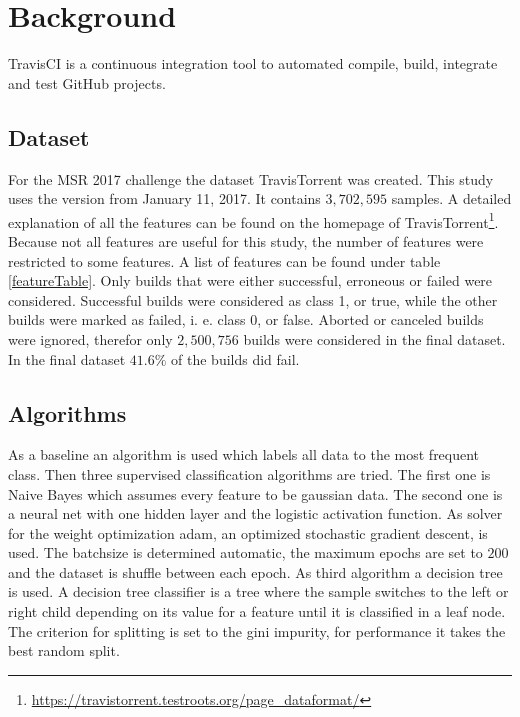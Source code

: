 \documentclass[a4paper,11pt]{article}
\begin{document}
\section{Background}

TravisCI is a continuous integration tool to automated compile, build, integrate and test GitHub projects. 

\subsection{Dataset}

For the MSR 2017 challenge the dataset TravisTorrent was created. This study uses the version from January 11, 2017. It contains $3,702,595$ samples. A detailed explanation of all the features can be found on the homepage of TravisTorrent\footnote{\url{https://travistorrent.testroots.org/page_dataformat/}}. Because not all features are useful for this study, the number of features were restricted to some features. A list of features can be found under table \ref{featureTable}. Only builds that were either successful, erroneous or failed were considered. Successful builds were considered as class 1, or true, while the other builds were marked as failed, i. e. class 0, or false. Aborted or canceled builds were ignored, therefor only $2,500,756$ builds were considered in the final dataset. In the final dataset $41.6\%$ of the builds did fail. 


\subsection{Algorithms}

As a baseline an algorithm is used which labels all data to the most frequent class. Then three supervised classification algorithms are tried. 
The first one is Naive Bayes which assumes every feature to be gaussian data. 
The second one is a neural net with one hidden layer and the logistic activation function. As solver for the weight optimization adam\cite{adam}, an optimized stochastic gradient descent, is used. The batchsize is determined automatic, the maximum epochs are set to $200$ and the dataset is shuffle between each epoch.
As third algorithm a decision tree is used. A decision tree classifier is a tree where the sample switches to the left or right child depending on its value for a feature until it is classified in a leaf node. The criterion for splitting is set to the gini impurity, for performance it takes the best random split. 
\end{document}
